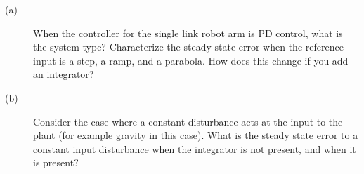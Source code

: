 
\begin{description}
\item[]
\item[(a)] When the controller for the single link robot arm is PD control, what is the system type?  Characterize the steady state error when the reference input is a step, a ramp, and a parabola.  How does this change if you add an integrator?
\item[(b)] Consider the case where a constant disturbance acts at the input to the plant (for example gravity in this case).  What is the steady state error to a constant input disturbance when the integrator is not present, and when it is present?
\end{description}
